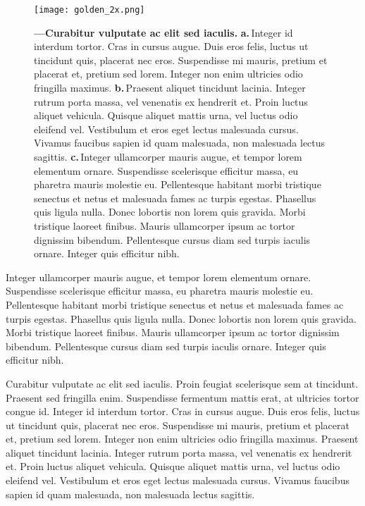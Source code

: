 \documentclass[11pt, a4paper]{report}
\begin{document}
\begin{figure}[t!] %
		\centering				
		\texttt{[image: golden\_2x.png]}		
		\caption[A standard figure]
		{ \textbf{---\;Curabitur vulputate ac elit sed iaculis.}
		\textbf{a.}\,Integer id interdum tortor. Cras in cursus augue. Duis eros felis, luctus ut tincidunt quis, placerat nec eros. Suspendisse mi mauris, pretium et placerat et, pretium sed lorem. Integer non enim ultricies odio fringilla maximus.
		\textbf{b.}\,Praesent aliquet tincidunt lacinia. Integer rutrum porta massa, vel venenatis ex hendrerit et. Proin luctus aliquet vehicula. Quisque aliquet mattis urna, vel luctus odio eleifend vel. Vestibulum et eros eget lectus malesuada cursus. Vivamus faucibus sapien id quam malesuada, non malesuada lectus sagittis. 
		\textbf{c.}\,Integer ullamcorper mauris augue, et tempor lorem elementum ornare. Suspendisse scelerisque efficitur massa, eu pharetra mauris molestie eu. Pellentesque habitant morbi tristique senectus et netus et malesuada fames ac turpis egestas. Phasellus quis ligula nulla. Donec lobortis non lorem quis gravida. Morbi tristique laoreet finibus. Mauris ullamcorper ipsum ac tortor dignissim bibendum. Pellentesque cursus diam sed turpis iaculis ornare. Integer quis efficitur nibh.
		}
		\label{fig:myfig2}  %
\end{figure}

\par Integer ullamcorper mauris augue, et tempor lorem elementum ornare. Suspendisse scelerisque efficitur massa, eu pharetra mauris molestie eu. Pellentesque habitant morbi tristique senectus et netus et malesuada fames ac turpis egestas. Phasellus quis ligula nulla. Donec lobortis non lorem quis gravida. Morbi tristique laoreet finibus. Mauris ullamcorper ipsum ac tortor dignissim bibendum. Pellentesque cursus diam sed turpis iaculis ornare. Integer quis efficitur nibh.

\par Curabitur vulputate ac elit sed iaculis. Proin feugiat scelerisque sem at tincidunt. Praesent sed fringilla enim. Suspendisse fermentum mattis erat, at ultricies tortor congue id. Integer id interdum tortor. Cras in cursus augue. Duis eros felis, luctus ut tincidunt quis, placerat nec eros. Suspendisse mi mauris, pretium et placerat et, pretium sed lorem. Integer non enim ultricies odio fringilla maximus. Praesent aliquet tincidunt lacinia. Integer rutrum porta massa, vel venenatis ex hendrerit et. Proin luctus aliquet vehicula. Quisque aliquet mattis urna, vel luctus odio eleifend vel. Vestibulum et eros eget lectus malesuada cursus. Vivamus faucibus sapien id quam malesuada, non malesuada lectus sagittis. 
\end{document}
